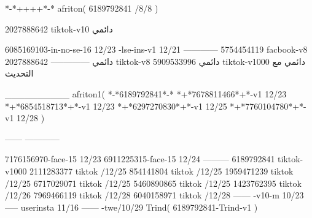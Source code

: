 *-*++++*-*
afriton(
6189792841 /8/8
)

2027888642 tiktok-v10
دائمي

6085169103-in-no-se-16 12/23
-lse-ins-v1 12/21
------------
5754454119 facbook-v8
دائمي
--------------
2027888642 tiktok-v8
دائمي
5909533996 tiktok-v1000
دائمي مع التحديث

__________
afriton1(
*-*6189792841*-*
*+*7678811466*+*-v1 12/23
*+*6854518713*+*-v1 12/23
*+*6297270830*+*-v1 12/25
*+*7760104780*+*-v1 12/28
)

------
------------

7176156970-face-15 12/23
6911225315-face-15 12/24
---------
6189792841 tiktok-v1000
2111283377 tiktok /12/25
854141804 tiktok /12/25
1959471239 tiktok /12/25
6717029071 tiktok /12/25
5460890865 tiktok /12/25
1423762395 tiktok /12/26
7969466119 tiktok /12/28
6040158971 tiktok /12/28
------
-v10-m 10/23
-----
userinsta 11/16
------
-twe/10/29
Trind(
6189792841-Trind-v1 
)
